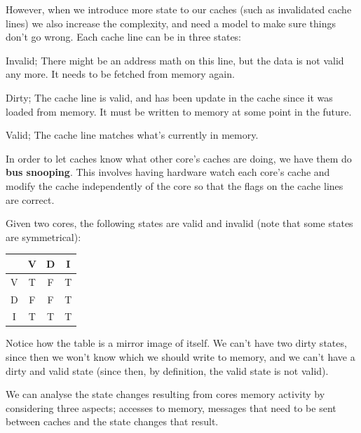 However, when we introduce more state to our caches (such as invalidated cache
lines) we also increase the complexity, and need a model to make sure things
don't go wrong. Each cache line can be in three states:

\begin{description}
  \item Invalid; There might be an address math on this line, but the data is 
  not valid any more. It needs to be fetched from memory again.
  \item Dirty; The cache line is valid, and has been update in the cache since 
  it was loaded from memory. It must be written to memory at some point in the 
  future.
  \item Valid; The cache line matches what's currently in memory.
\end{description}

In order to let caches know what other core's caches are doing, we have them do
\textbf{bus snooping}. This involves having hardware watch each core's cache and
modify the cache independently of the core so that the flags on the cache lines
are correct.

Given two cores, the following states are valid and invalid (note that
some states are symmetrical):

\begin{center}
  \begin{tabular}{c|c c c}
      & V & D & I\\ \hline
    V & T & F & T\\
    D & F & F & T\\
    I & T & T & T
  \end{tabular}
\end{center}

Notice how the table is a mirror image of itself. We can't have two dirty
states, since then we won't know which we should write to memory, and we can't
have a dirty and valid state (since then, by definition, the valid state is not
valid).

We can analyse the state changes resulting from cores memory activity
by considering three aspects; accesses to memory, messages that need
to be sent between caches and the state changes that result.

